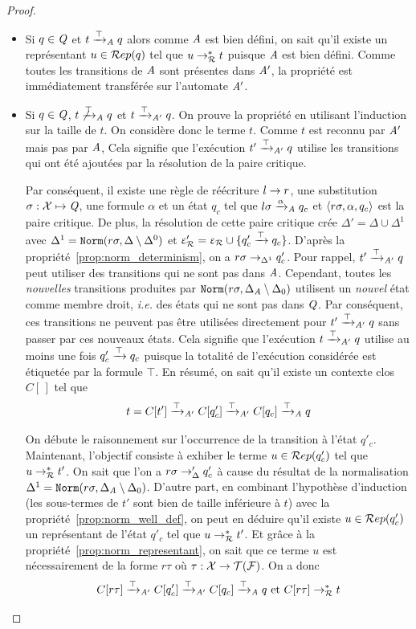 \begin{proof}
\begin{enumerate}
  \begin{itemize}
  \item Si $q\in\mathit Q$ et $t\xrightarrow{\top}_\mathit A q$ alors comme $\mathit A$ est bien défini, on sait qu'il 
    existe un représentant $u\in \mathcal R ep(q)$ tel que $u\rightarrow_\mathcal R^* t$ puisque $\mathit A$ est bien défini.
    Comme toutes les transitions de $\mathit A$ sont présentes dans $\mathit A'$, la propriété est immédiatement transférée
    sur l'automate $\mathit A'$.

  \item Si $q\in\mathit Q$, $t \not\xrightarrow{\top}_\mathit A q$ et $t \xrightarrow{\top}_{\mathit A'} q$. On prouve la propriété en utilisant l'induction
    sur la taille de $t$. On considère donc le terme $t$. Comme $t$ est reconnu
    par $\mathit A'$ mais pas par $\mathit A$, Cela signifie que l'exécution $t' \xrightarrow{\top}_{\mathit A'} q$ utilise
    les transitions qui ont été ajoutées par la résolution de la paire critique.
    
    Par conséquent, il existe une règle de réécriture $l \rightarrow r$, une substitution $\sigma:\mathcal X \mapsto \mathit Q$,
    une formule $\alpha$ et un état  $q_c$ tel que $l\sigma \xrightarrow{\alpha}_\mathit A q_c$ et $\langle
    r\sigma, \alpha, q_c\rangle$ est la paire critique. De plus, la résolution de cette paire
    critique crée $\Delta'= \Delta \cup \Delta^1$ avec $\Delta^1 = \mathtt{Norm}(r\sigma,\Delta \setminus \Delta^0)$
    et $\upvarepsilon_{\mathcal R}'=\upvarepsilon_{\mathcal R} \cup \{q'_c \xrightarrow{\top} q_c\}$.
    D'après la propriété~\ref{prop:norm_determinism}, on a $r\sigma \rightarrow_{\Delta^1} q'_c$.
    Pour rappel, $t' \xrightarrow{\top}_{\mathit A'} q$ peut utiliser des transitions qui ne sont pas dans $\mathit A$. 
    Cependant, toutes les {\em nouvelles} transitions produites par
    $\mathtt{Norm}(r\sigma,\Delta_\mathit A\setminus \Delta_0)$ utilisent un {\em nouvel} état comme membre droit,
    \textit{i.e.} des états qui ne sont pas dans $\mathit Q$. Par conséquent, ces transitions
    ne peuvent pas être utilisées directement pour $t' \xrightarrow{\top}_{\mathit A'} q$ sans passer par ces nouveaux états. Cela signifie
    que l'exécution  $t \xrightarrow{\top}_{\mathit A'} q$ utilise au moins une fois $q'_c \xrightarrow{\top} q_c$
    puisque la totalité de l'exécution considérée est étiquetée par la formule $\top$. 
    En résumé, on sait qu'il existe un contexte clos $C[\,]$ tel que
    \[t=C[t'] \xrightarrow{\top}_{\mathit A'} C[q'_c] \xrightarrow{\top}_{\mathit A'} C[q_c] \xrightarrow{\top}_\mathit A q\]

    On débute le raisonnement sur l'occurrence de la transition à l'état $q'_c$. 
    Maintenant, l'objectif consiste à exhiber le terme $u\in \mathcal R ep(q_c')$ tel que $u \rightarrow_\mathcal R^* t'$. 
    On sait que l'on a $r\sigma \rightarrow_\Delta' q'_c$ à cause du résultat de la normalisation $\Delta^1= \mathtt{Norm}(r\sigma,\Delta_\mathit A\setminus \Delta_0)$.
    D'autre part, en combinant l'hypothèse d'induction (les sous-termes de $t'$ sont bien de taille inférieure à $t$) avec la propriété~\ref{prop:norm_well_def},
    on peut en déduire qu'il existe $u \in \mathcal R ep(q_c')$ un représentant de l'état $q'_c$ tel que $u \rightarrow_\mathcal R^* t'$.
    Et grâce à la propriété~\ref{prop:norm_representant}, on sait que ce terme $u$ est nécessairement de la forme $r\tau$ où $\tau : \mathcal X \rightarrow \mathcal{T(F)}$.
    On a donc
    \[ C[r\tau] \xrightarrow{\top}_{\mathit A'} C[q'_c] \xrightarrow{\top}_{\mathit A'} C[q_c] \xrightarrow{\top}_\mathit A q \textrm{ et } C[r\tau] \rightarrow_\mathcal R^* t \]
    

\end{itemize}
\end{enumerate}
\end{proof}
